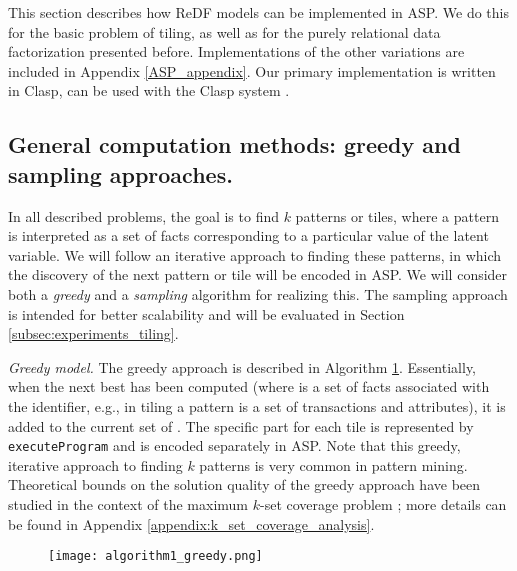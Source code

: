 This section describes how ReDF models can be implemented in ASP. We do this for the basic problem of tiling, as well as for the purely relational data factorization presented before. Implementations of the other variations are included in Appendix \ref{ASP_appendix}. Our primary implementation is written in Clasp, can be used with the Clasp system \parencite{ASPbook,BrewkaCACM}.

\subsection{General computation methods: greedy and sampling approaches.} 
In all described problems, the goal is to find $k$ patterns or tiles, where a pattern is interpreted as a set of facts corresponding to a particular value of the latent variable. 
We will follow an iterative approach to finding these patterns,
in which the discovery of the next pattern or tile will be encoded in ASP.
We will consider both a {\em greedy} and a {\em sampling} algorithm
for realizing this. The sampling approach is intended for better scalability and will
be evaluated in Section \ref{subsec:experiments_tiling}.

\textit{Greedy model.}
The greedy approach is described  in  Algorithm \ref{alg:greedy}. Essentially, 
when the next best \tile has been computed (where \tile is a set of facts associated with the \tile identifier, e.g., in tiling a pattern is a set of transactions and attributes), it is added to the current set of \tiles. The specific part for each tile is represented by \texttt{executeProgram} and is encoded separately in ASP. Note that this greedy, iterative approach to finding $k$ patterns is very common in pattern mining. 
\changesb Theoretical bounds on the solution quality of the greedy approach have been studied in the context of the maximum $k$-set coverage problem \parencite{max_k_set_cover1, max_k_set_cover2}; more details can be found in Appendix \ref{appendix:k_set_coverage_analysis}. \changese
\begin{figure}[thb]
\texttt{[image: algorithm1\_greedy.png]}
 \label{alg:greedy}
\end{figure}

